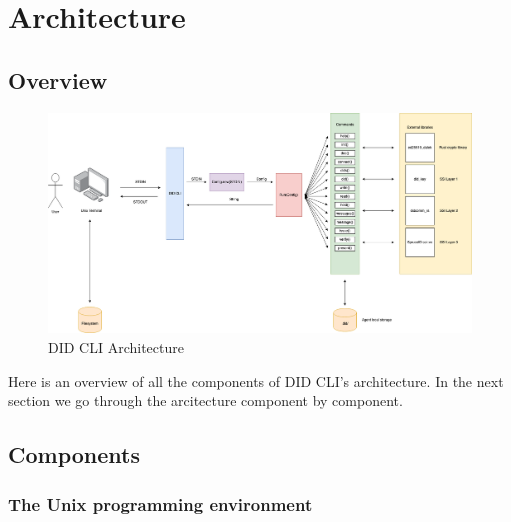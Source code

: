 \hypertarget{architecture}{%
\chapter{Architecture}\label{architecture}}

\hypertarget{overview}{%
\section{Overview}\label{overview}}

\begin{figure}[H]
\centering
\includegraphics[width=\textwidth]{Architecture 1442df162dbe45f4a423ba37d3e12363/component-overview(1).png}
\caption{DID CLI Architecture}
\end{figure}

Here is an overview of all the components of DID CLI's architecture. In the next section we go through the arcitecture component by component.




\pagebreak




\hypertarget{components}{%
\section{Components}\label{components}}

\hypertarget{the-unix-programming-environment}{%
\subsection{The Unix programming
environment}\label{the-unix-programming-environment}}

